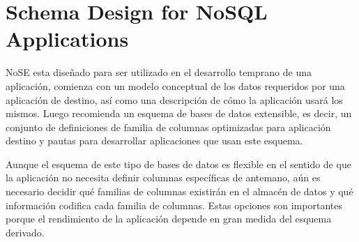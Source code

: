 \section{Schema Design for NoSQL Applications}
NoSE esta diseñado para ser utilizado en el desarrollo temprano de una aplicación, comienza con un modelo conceptual de los datos requeridos por una aplicación de destino, así como una descripción de cómo la aplicación usará los mismos. Luego recomienda un esquema de bases de datos extensible, es decir, un conjunto de definiciones de familia de columnas optimizadas para aplicación destino y pautas para desarrollar aplicaciones que usan este esquema. 


Aunque el esquema de este tipo de bases de datos es flexible en el sentido de que la aplicación no necesita definir columnas específicas de antemano, aún es necesario decidir qué familias de columnas existirán en el almacén de datos y qué información codifica cada familia de columnas. Estas opciones son importantes porque el rendimiento de la aplicación depende en gran medida del esquema derivado.  


